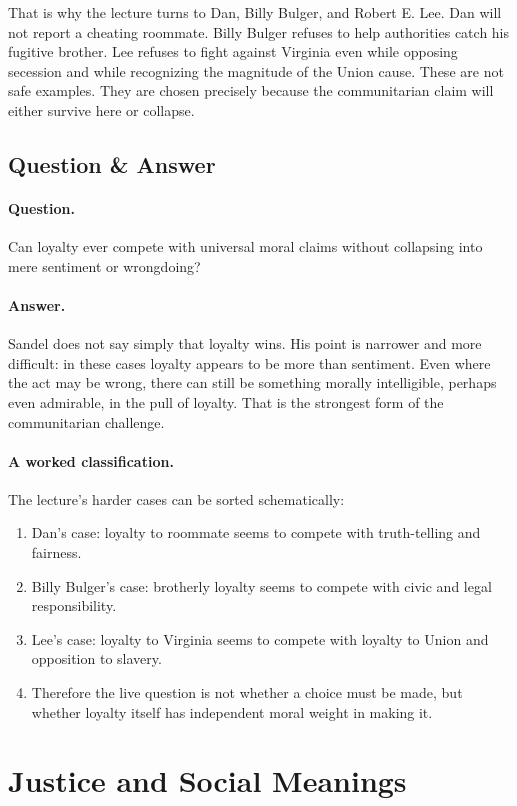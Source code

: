 That is why the lecture turns to Dan, Billy Bulger, and Robert E. Lee. Dan will not report a cheating roommate. Billy Bulger refuses to help authorities catch his fugitive brother. Lee refuses to fight against Virginia even while opposing secession and while recognizing the magnitude of the Union cause. These are not safe examples. They are chosen precisely because the communitarian claim will either survive here or collapse.

\subsection{Question \& Answer}

\paragraph{Question.} Can loyalty ever compete with universal moral claims without collapsing into mere sentiment or wrongdoing?

\paragraph{Answer.} Sandel does not say simply that loyalty wins. His point is narrower and more difficult: in these cases loyalty appears to be more than sentiment. Even where the act may be wrong, there can still be something morally intelligible, perhaps even admirable, in the pull of loyalty. That is the strongest form of the communitarian challenge.

\paragraph{A worked classification.}
The lecture's harder cases can be sorted schematically:
\begin{enumerate}
\item Dan's case: loyalty to roommate seems to compete with truth-telling and fairness.
\item Billy Bulger's case: brotherly loyalty seems to compete with civic and legal responsibility.
\item Lee's case: loyalty to Virginia seems to compete with loyalty to Union and opposition to slavery.
\item Therefore the live question is not whether a choice must be made, but whether loyalty itself has independent moral weight in making it.
\end{enumerate}

\section{Justice and Social Meanings}


